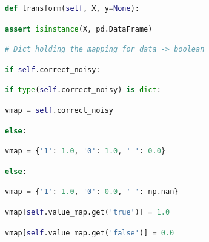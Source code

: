 \documentclass[
  11pt,
  a4paper,
  DIV=12,captions=tableheading,oneside]{scrbook}
\begin{document}
\begin{lstlisting}[language=Python,stepnumber=2,basicstyle=\footnotesize]
\end{lstlisting}
\begin{lstlisting}[language=Python,stepnumber=2,basicstyle=\footnotesize]
    def transform(self, X, y=None):\end{lstlisting}
\begin{lstlisting}[language=Python,stepnumber=2,basicstyle=\footnotesize]
        assert isinstance(X, pd.DataFrame)\end{lstlisting}
\begin{lstlisting}[language=Python,stepnumber=2,basicstyle=\footnotesize]
        # Dict holding the mapping for data -> boolean\end{lstlisting}
\begin{lstlisting}[language=Python,stepnumber=2,basicstyle=\footnotesize]
        if self.correct_noisy:\end{lstlisting}
\begin{lstlisting}[language=Python,stepnumber=2,basicstyle=\footnotesize]
            if type(self.correct_noisy) is dict:\end{lstlisting}
\begin{lstlisting}[language=Python,stepnumber=2,basicstyle=\footnotesize]
                vmap = self.correct_noisy\end{lstlisting}
\begin{lstlisting}[language=Python,stepnumber=2,basicstyle=\footnotesize]
            else:\end{lstlisting}
\begin{lstlisting}[language=Python,stepnumber=2,basicstyle=\footnotesize]
                vmap = {'1': 1.0, '0': 1.0, ' ': 0.0}\end{lstlisting}
\begin{lstlisting}[language=Python,stepnumber=2,basicstyle=\footnotesize]
        else:\end{lstlisting}
\begin{lstlisting}[language=Python,stepnumber=2,basicstyle=\footnotesize]
            vmap = {'1': 1.0, '0': 0.0, ' ': np.nan}\end{lstlisting}
\begin{lstlisting}[language=Python,stepnumber=2,basicstyle=\footnotesize]
        vmap[self.value_map.get('true')] = 1.0\end{lstlisting}
\begin{lstlisting}[language=Python,stepnumber=2,basicstyle=\footnotesize]
        vmap[self.value_map.get('false')] = 0.0\end{lstlisting}
\end{document}
